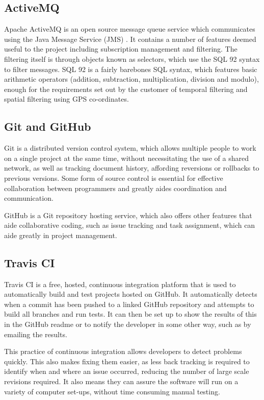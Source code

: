 \documentclass[a4paper, 12pt, twoside]{article}
\begin{document}
\subsection{ActiveMQ}
\label{sec:bg_activemq}

Apache ActiveMQ is an open source message queue service which communicates using the Java Message Service (JMS) \cite{activeMQ}. It contains a number of features deemed useful to the project including subscription management and filtering. The filtering itself is through objects known as selectors, which use the SQL 92 syntax to filter messages. SQL 92 is a fairly barebones SQL syntax, which features basic arithmetic operators (addition, subtraction, multiplication, division and modulo), enough for the requirements set out by the customer of temporal filtering and spatial filtering using GPS co-ordinates.

\subsection{Git and GitHub}
\label{sec:bg_git}

Git is a distributed version control system, which allows multiple people to work on a single project at the same time, without necessitating the use of a shared network, as well as tracking document history, affording reversions or rollbacks to previous versions. Some form of source control is essential for effective collaboration between programmers and greatly aides coordination and communication.

GitHub is a Git repository hosting service, which also offers other features that aide collaborative coding, such as issue tracking and task assignment, which can aide greatly in project management.

\subsection{Travis CI}
\label{sec:bg_travis}

Travis CI is a free, hosted, continuous integration platform that is used to automatically build and test projects hosted on GitHub. It automatically detects when a commit has been pushed to a linked GitHub repository and attempts to build all branches and run tests. It can then be set up to show the results of this in the GitHub readme or to notify the developer in some other way, such as by emailing the results.

This practice of continuous integration allows developers to detect problems quickly. This also makes fixing them easier, as less back tracking is required to identify when and where an issue occurred, reducing the number of large scale revisions required. It also means they can assure the software will run on a variety of computer set-ups, without time consuming manual testing\cite{fowler2006continuous}.
\end{document}
